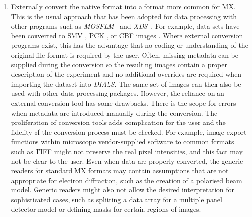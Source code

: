 \documentclass[preprint]{iucr}
\newcommand{\dials}{\emph{DIALS}\xspace}
\newcommand{\xds}{\emph{XDS}\xspace}
\newcommand{\mosflm}{\emph{MOSFLM}\xspace}
\begin{document}
\begin{enumerate}
  \item Externally convert the native format into a format more common for MX.
  This is the usual approach that has been adopted for data processing with
  other programs such as \mosflm~\cite{leslie2007} and
  \xds~\cite{kabsch2010xds}. For example, data sets have been converted to SMV
  \cite{Hattne2015}, PCK \cite{Clabbers2017}, or CBF images \cite{Gruene2018}.
  Where external conversion programs exist, this has the advantage that no
  coding or understanding of the original file format is required by the user.
  Often, missing metadata can be supplied during the conversion so the
  resulting images contain a proper description of the experiment and no
  additional overrides are required when importing the dataset into \dials. The
  same set of images can then also be used with other data processing packages.
  However, the reliance on an external conversion tool has some drawbacks.
  There is the scope for errors when metadata are introduced manually during
  the conversion. The proliferation of conversion tools adds complication for
  the user and the fidelity of the conversion process must be checked. For
  example, image export functions within microscope vendor-supplied software to
  common formats such as TIFF might not preserve the real pixel intensities,
  and this fact may not be clear to the user. Even when data are properly
  converted, the generic readers for standard MX formats may contain
  assumptions that are not appropriate for electron diffraction, such as the
  creation of a polarised beam model. Generic readers might also not allow the
  desired interpretation for sophisticated cases, such as splitting a data
  array for a multiple panel detector model or defining masks for certain
  regions of images.


\end{enumerate}
\end{document}
